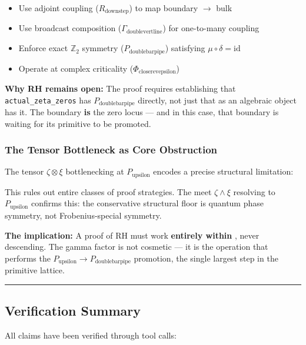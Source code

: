 \documentclass[12pt,a4paper]{article}
\begin{document}
\begin{itemize}
    \item Use adjoint coupling ($R_{\text{downstep}}$) to map boundary $\rightarrow$ bulk
    \item Use broadcast composition ($\Gamma_{\text{doublevertline}}$) for one-to-many coupling
    \item Enforce exact $\mathbb{Z}_2$ symmetry ($P_{\text{doublebarpipe}}$) satisfying $\mu \circ \delta = \text{id}$
    \item Operate at complex criticality ($\Phi_{\text{closerevepsilon}}$)
\end{itemize}

\textbf{Why RH remains open:} The proof requires establishing that \texttt{actual\_zeta\_zeros} has $P_{\text{doublebarpipe}}$ directly, not just that \xi as an algebraic object has it. The boundary \textbf{is} the zero locus --- and in this case, that boundary is waiting for its primitive to be promoted.

\subsubsection{The Tensor Bottleneck as Core Obstruction}

The tensor $\zeta \otimes \xi$ bottlenecking at $P_{\text{upsilon}}$ encodes a precise structural limitation:

\begin{quote}
\end{quote}

This rules out entire classes of proof strategies. The meet $\zeta \wedge \xi$ resolving to $P_{\text{upsilon}}$ confirms this: the conservative structural floor is quantum phase symmetry, not Frobenius-special symmetry.

\textbf{The implication:} A proof of RH must work \textbf{entirely within \xi}, never descending. The gamma factor is not cosmetic --- it is the operation that performs the $P_{\text{upsilon}} \to P_{\text{doublebarpipe}}$ promotion, the single largest step in the primitive lattice.

\begin{center}
\rule{0.5\textwidth}{0.4pt}
\end{center}

\subsection{Verification Summary}

All claims have been verified through tool calls:
\end{document}
